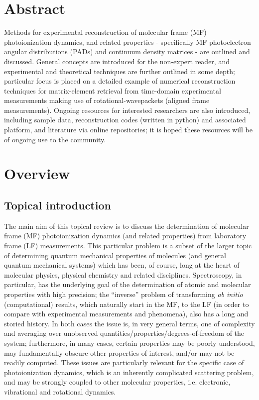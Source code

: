 \section{Abstract}

Methods for experimental reconstruction of molecular frame (MF) photoionization dynamics, and related properties - specifically MF photoelectron angular distributions (PADs) and continuum density matrices - are outlined and discussed. General concepts are introduced for the non-expert reader, and experimental and theoretical techniques are further outlined in some depth; particular focus is placed on a detailed example of numerical reconstruction techniques for matrix-element retrieval from time-domain experimental measurements making use of rotational-wavepackets (aligned frame measurements). Ongoing resources for interested researchers are also introduced, including sample data, reconstruction codes (written in python) and associated platform, and literature via online repositories; it is hoped these resources will be of ongoing use to the community.

\section{Overview}

\subsection{Topical introduction}
The main aim of this topical review is to discuss the determination of molecular frame (MF) photoionization dynamics (and related properties) from laboratory frame (LF) measurements. This particular problem is a subset of the larger topic of determining quantum mechanical properties of molecules (and general quantum mechanical systems) which has been, of course, long at the heart of molecular physics, physical chemistry and related disciplines. Spectroscopy, in particular, has the underlying goal of the determination of atomic and molecular properties with high precision; the ``inverse” problem of transforming \textit{ab initio} (computational) results, which naturally start in the MF, to the LF (in order to compare with experimental measurements and phenomena), also has a long and storied history. In both cases the issue is, in very general terms, one of complexity and averaging over unobserved quantities/properties/degrees-of-freedom of the system; furthermore, in many cases, certain properties may be poorly understood, may fundamentally obscure other properties of interest, and/or may not be readily computed. These issues are particularly relevant for the specific case of photoionization dynamics, which is an inherently complicated scattering problem, and may be strongly coupled to other molecular properties, i.e. electronic, vibrational and rotational dynamics. 

